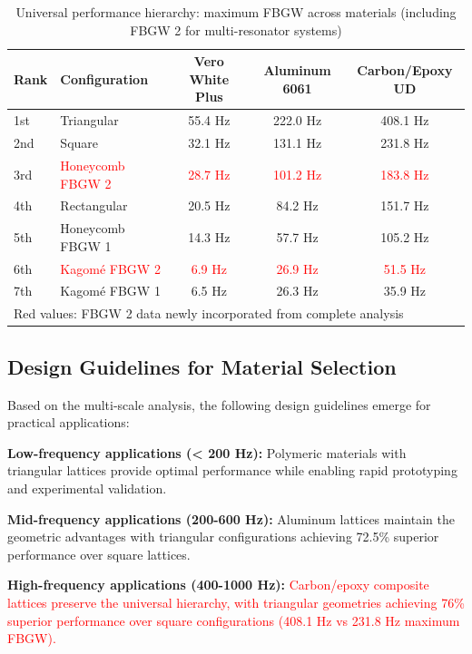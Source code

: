 \documentclass[review,numbers,sort&compress]{elsarticle}
\begin{document}
\begin{table}[!htb]
\centering
\caption{Universal performance hierarchy: maximum FBGW across materials (including FBGW 2 for multi-resonator systems)}
\label{tab:universal_hierarchy}
\scriptsize
\begin{tabular}{llccc}
\hline
Rank & Configuration & Vero White Plus & Aluminum 6061 & Carbon/Epoxy UD \\
\hline
1st & Triangular & 55.4 Hz & 222.0 Hz & 408.1 Hz \\
2nd & Square & 32.1 Hz & 131.1 Hz & 231.8 Hz \\
3rd & \textcolor{red}{Honeycomb FBGW 2} & \textcolor{red}{28.7 Hz} & \textcolor{red}{101.2 Hz} & \textcolor{red}{183.8 Hz} \\
4th & Rectangular & 20.5 Hz & 84.2 Hz & 151.7 Hz \\
5th & Honeycomb FBGW 1 & 14.3 Hz & 57.7 Hz & 105.2 Hz \\
6th & \textcolor{red}{Kagomé FBGW 2} & \textcolor{red}{6.9 Hz} & \textcolor{red}{26.9 Hz} & \textcolor{red}{51.5 Hz} \\
7th & Kagomé FBGW 1 & 6.5 Hz & 26.3 Hz & 35.9 Hz \\
\hline
\multicolumn{5}{l}{\footnotesize Red values: FBGW 2 data newly incorporated from complete analysis} \\
\end{tabular}
\end{table}

\subsection{Design Guidelines for Material Selection}

Based on the multi-scale analysis, the following design guidelines emerge for practical applications:

\textbf{Low-frequency applications (< 200 Hz):} Polymeric materials with triangular lattices provide optimal performance while enabling rapid prototyping and experimental validation.

\textbf{Mid-frequency applications (200-600 Hz):} Aluminum lattices maintain the geometric advantages with triangular configurations achieving 72.5\% superior performance over square lattices.

\textbf{High-frequency applications (400-1000 Hz):} \textcolor{red}{Carbon/epoxy composite lattices preserve the universal hierarchy, with triangular geometries achieving 76\% superior performance over square configurations (408.1 Hz vs 231.8 Hz maximum FBGW).}
\end{document}
